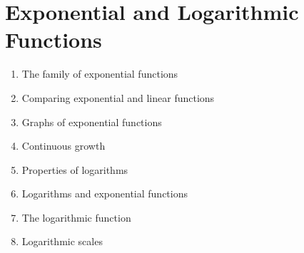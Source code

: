 
\chapter{Exponential and Logarithmic Functions}

\begin{enumerate}
\item The family of exponential functions

\item Comparing exponential and linear functions

\item Graphs of exponential functions

\item Continuous growth

\item Properties of logarithms

\item Logarithms and exponential functions

\item The logarithmic function

\item Logarithmic scales
\end{enumerate}
